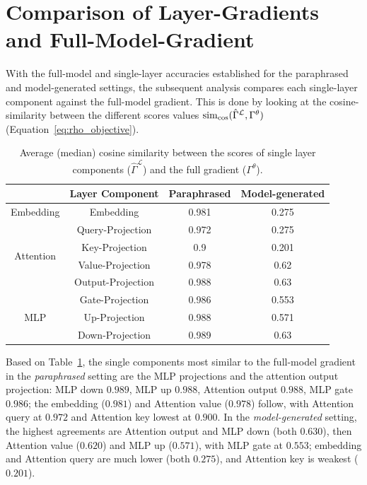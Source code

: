 \section{Comparison of Layer-Gradients and Full-Model-Gradient}\label{sec:layer_vs_full}
With the full-model and single-layer accuracies established for the paraphrased and model-generated settings, the subsequent analysis compares each single-layer component against the full-model gradient. This is done by looking at the cosine-similarity between the different scores values $\operatorname{sim}_{\cos}(\hat{\Gamma}^{\mathcal{L}},\Gamma^\theta)$ (Equation~\ref{eq:rho_objective}).
\begin{table}[H]
    \centering
    \begin{tabular}{|c|c|c|c|}
        \hline
        & \textbf{Layer Component} & \textbf{Paraphrased} & \textbf{Model-generated} \\
        \hline
        \multirow{1}{5em}{Embedding}
        & Embedding & 0.981 & 0.275 \\
        \hline
        \multirow{4}{5em}{Attention}
        & Query-Projection & 0.972 & 0.275 \\
        & Key-Projection & 0.9 & 0.201 \\
        & Value-Projection & 0.978 & 0.62 \\
        & Output-Projection & 0.988 & 0.63 \\
        \hline
        \multirow{3}{5em}{MLP}
        & Gate-Projection & 0.986 & 0.553 \\
        & Up-Projection & 0.988 & 0.571 \\
        & Down-Projection & 0.989 & 0.63 \\
        \hline
    \end{tabular}
    \caption{Average (median) cosine similarity between the scores of single layer components ($\hat{\Gamma}^{\mathcal{L}}$) and the full gradient ($\Gamma^\theta$).}
    \label{tab:average_cosine_similarity_full_gradient_comparison}
\end{table}
\noindent Based on Table~\ref{tab:average_cosine_similarity_full_gradient_comparison}, the single components most similar to the full-model gradient in the \emph{paraphrased} setting are the MLP projections and the attention output projection: {MLP down} $0.989$, {MLP up} $0.988$, {Attention output} $0.988$, {MLP gate} $0.986$; the embedding ($0.981$) and Attention value ($0.978$) follow, with Attention query at $0.972$ and Attention key lowest at $0.900$. In the \emph{model-generated} setting, the highest agreements are {Attention output} and {MLP down} (both $0.630$), then Attention value ($0.620$) and MLP up ($0.571$), with MLP gate at $0.553$; embedding and Attention query are much lower (both $0.275$), and Attention key is weakest ($0.201$).

